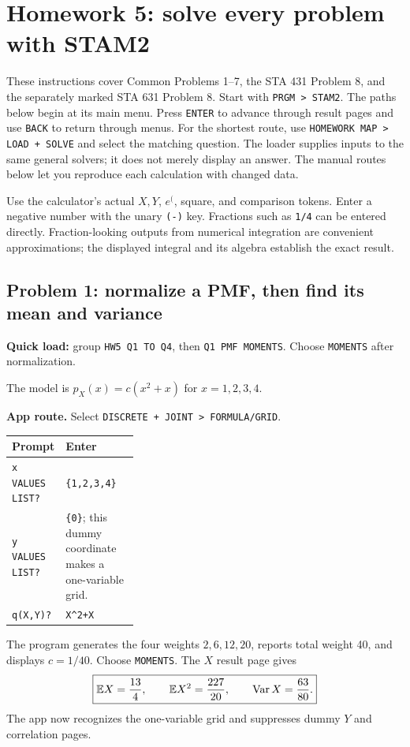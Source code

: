 \section{Homework 5: solve every problem with STAM2}
\label{sec:hw5-app-walkthrough}
These instructions cover Common Problems 1--7, the STA 431 Problem 8, and the separately marked STA 631 Problem 8. Start with \texttt{PRGM > STAM2}. The paths below begin at its main menu. Press \texttt{ENTER} to advance through result pages and use \texttt{BACK} to return through menus. For the shortest route, use \texttt{HOMEWORK MAP > LOAD + SOLVE} and select the matching question. The loader supplies inputs to the same general solvers; it does not merely display an answer. The manual routes below let you reproduce each calculation with changed data.

Use the calculator's actual $X,Y$, $e^{(}$, square, and comparison tokens. Enter a negative number with the unary \texttt{(-)} key. Fractions such as \texttt{1/4} can be entered directly. Fraction-looking outputs from numerical integration are convenient approximations; the displayed integral and its algebra establish the exact result.

\subsection{Problem 1: normalize a PMF, then find its mean and variance}
\textbf{Quick load:} group \texttt{HW5 Q1 TO Q4}, then \texttt{Q1 PMF MOMENTS}. Choose \texttt{MOMENTS} after normalization.

The model is $p_X(x)=c(x^2+x)$ for $x=1,2,3,4$.

\textbf{App route.} Select \texttt{DISCRETE + JOINT > FORMULA/GRID}.
\begin{center}
\begin{tabularx}{\linewidth}{@{}p{0.32\linewidth}X@{}}
\toprule Prompt & Enter\\\midrule
\texttt{x VALUES LIST?} & \texttt{\{1,2,3,4\}}\\
\texttt{y VALUES LIST?} & \texttt{\{0\}}; this dummy coordinate makes a one-variable grid.\\
\texttt{q(X,Y)?} & \texttt{X\^{}2+X}\\\bottomrule
\end{tabularx}
\end{center}
The program generates the four weights $2,6,12,20$, reports total weight 40, and displays $c=1/40$. Choose \texttt{MOMENTS}. The $X$ result page gives
\[
\boxed{\mathbb E X=\frac{13}{4},\qquad \mathbb E X^2=\frac{227}{20},\qquad \operatorname{Var} X=\frac{63}{80}.}
\]
The app now recognizes the one-variable grid and suppresses dummy $Y$ and correlation pages.

